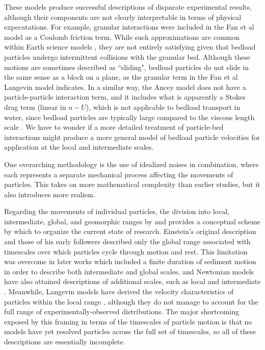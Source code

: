 These models produce successful descriptions of disparate experimental results, although their components are not clearly interpretable in terms of physical expecatations. For example, granular interactions were included in the Fan et al model as a Coulomb friction term. While such approximations are common within Earth science models \citep{Kirkby1971}, they are not entirely satisfying given that bedload particles undergo intermittent collisions with the granular bed. Although these motions are sometimes described as ``sliding", bedload particles do not slide in the same sense as a block on a plane, as the granular term in the Fan et al Langevin model indicates.
In a similar way, the Ancey model does not have a particle-particle interaction term, and it includes what is apparently a Stokes drag term (linear in $u-U$), which is not applicable to bedload transport in water, since bedload particles are typically large compared to the viscous length scale \citep{Clift1978}.
We have to wonder if a more detailed treatment of particle-bed interactions might produce a more general model of bedload particle velocities for application at the local and intermediate scales.


One overarching methodology is the use of idealized noises in combination, where each represents a separate mechanical process affecting the movements of particles. This takes on more mathematical complexity than earlier studies, but it also introduces more realism.



Regarding the movements of individual particles, the division into local, intermediate, global, and geomorphic ranges by \citet{Nikora2001,Nikora2002} and \citet{Hassan2017} provides a conceptual scheme by which to organize the current state of research.
Einstein's original description \citep{Einstein1937} and those of his early followers \citep{} described only the global range associated with timescales over which particles cycle through motion and rest.
This limitation was overcome in later works which included a finite duration of sediment motion in order to describe both intermediate and global scales, and Newtonian models have also attained descriptions of additional scales, such as local and intermediate \citep{}.
Meanwhile, Langevin models have derived the velocity characteristics of particles within the local range \citep{}, although they do not manage to account for the full range of experimentally-observed distributions.
The major shortcoming exposed by this framing in terms of the timescales of particle motion is that no models have yet resolved particles across the full set of timescales, so all of these descriptions are essentially incomplete.

